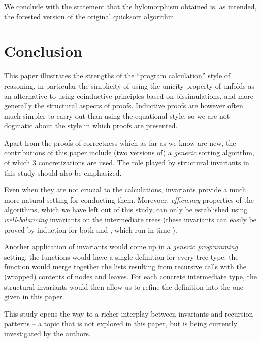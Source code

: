 \documentclass[a4paper,11pt]{llncs}
\begin{document}
We conclude with the statement that the hylomorphism obtained is, as
intended, the forested version of the original quicksort algorithm.





\section{Conclusion}
\label{sec:con}






This paper illustrates the strengths of the ``program calculation''
style of reasoning, in particular the simplicity of using the unicity
property of unfolds as an alternative to using coinductive principles
based on bissimulations, and more generally the structural aspects of
proofs. Inductive proofs are however often much simpler to carry out
than using the equational style, so we are not dogmatic about the
style in which proofs are presented.

Apart from the proofs of correctness which as far as we know are new,
the contributions of this paper include (two versions of) a
\emph{generic} sorting algorithm, of which 3 concretizations are used.
The role played by structural invariants in this study should also be
emphasized. 

Even when they are not crucial to the calculations, invariants provide
a much more natural setting for conducting them. Morevoer,
\emph{efficiency} properties of the algorithms, which we have left out
of this study, can only be established using \emph{well-balancing}
invariants on the intermediate trees (these invariants can easily be
proved by induction for both  and , which run
in time ).

Another application of invariants would come up in a \emph{generic
  programming} setting: the  functions would have a single
definition for every tree type: the function would merge together the
lists resulting from recursive calls with the (wrapped) contents of
nodes and leaves. For each concrete intermediate type, the structural
invariants would then allow us to refine the definition into the one
given in this paper.

This study opens the way to a richer interplay between invariants and
recursion patterns -- a topic that is not explored in this paper, but
is being currently investigated by the authors.
\end{document}
